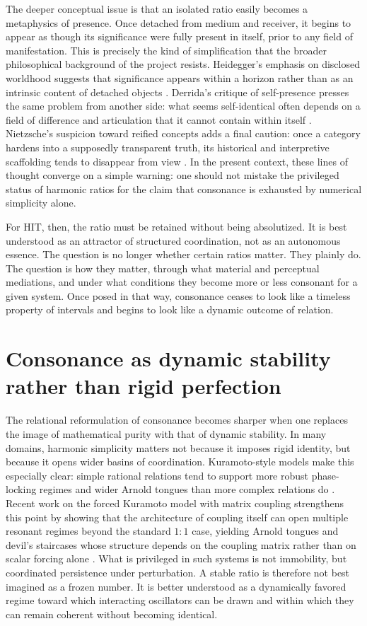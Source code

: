 The deeper conceptual issue is that an isolated ratio easily becomes a metaphysics of presence. Once detached from medium and receiver, it begins to appear as though its significance were fully present in itself, prior to any field of manifestation. This is precisely the kind of simplification that the broader philosophical background of the project resists. Heidegger's emphasis on disclosed worldhood suggests that significance appears within a horizon rather than as an intrinsic content of detached objects \parencite{heidegger_1927}. Derrida's critique of self-presence presses the same problem from another side: what seems self-identical often depends on a field of difference and articulation that it cannot contain within itself \parencite{derrida_1967}. Nietzsche's suspicion toward reified concepts adds a final caution: once a category hardens into a supposedly transparent truth, its historical and interpretive scaffolding tends to disappear from view \parencite{nietzsche_1873}. In the present context, these lines of thought converge on a simple warning: one should not mistake the privileged status of harmonic ratios for the claim that consonance is exhausted by numerical simplicity alone.

For HIT, then, the ratio must be retained without being absolutized. It is best understood as an attractor of structured coordination, not as an autonomous essence. The question is no longer whether certain ratios matter. They plainly do. The question is how they matter, through what material and perceptual mediations, and under what conditions they become more or less consonant for a given system. Once posed in that way, consonance ceases to look like a timeless property of intervals and begins to look like a dynamic outcome of relation.


\section{Consonance as dynamic stability rather than rigid perfection}


The relational reformulation of consonance becomes sharper when one replaces the image of mathematical purity with that of dynamic stability. In many domains, harmonic simplicity matters not because it imposes rigid identity, but because it opens wider basins of coordination. Kuramoto-style models make this especially clear: simple rational relations tend to support more robust phase-locking regimes and wider Arnold tongues than more complex relations do \parencite{kuramoto_1984,pikovsky_2001,strogatz_2000}. Recent work on the forced Kuramoto model with matrix coupling strengthens this point by showing that the architecture of coupling itself can open multiple resonant regimes beyond the standard $1{:}1$ case, yielding Arnold tongues and devil's staircases whose structure depends on the coupling matrix rather than on scalar forcing alone \parencite{costa_deaguiar_2026}. What is privileged in such systems is not immobility, but coordinated persistence under perturbation. A stable ratio is therefore not best imagined as a frozen number. It is better understood as a dynamically favored regime toward which interacting oscillators can be drawn and within which they can remain coherent without becoming identical.

